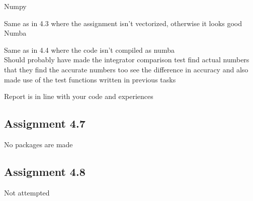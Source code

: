 \documentclass[a4paper]{article}
\begin{document}
		
	
Numpy

Same as in 4.3 where the assignment isn't vectorized, otherwise it looks good\\


Numba

Same as in 4.4 where the code isn't compiled as numba\\


Should probably have made the integrator comparison test find actual numbers that they find the accurate numbers too see the difference in accuracy and also made use of the test functions written in previous tasks

Report is in line with your code and experiences


\subsection*{Assignment 4.7}
No packages are made


\subsection*{Assignment 4.8}
Not attempted





\end{document}
